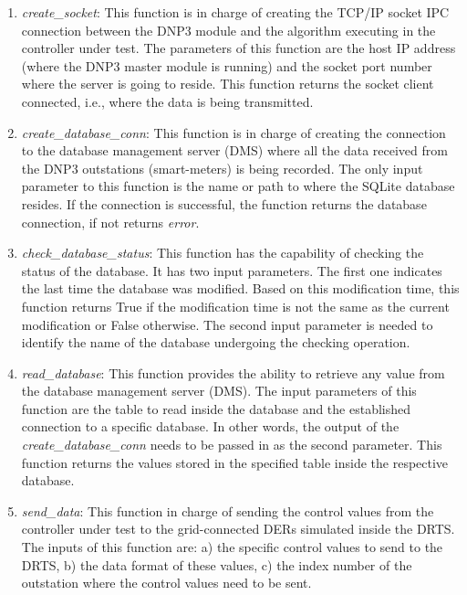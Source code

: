 \begin{enumerate}
    \item \textit{create\_socket}: This function is in charge of creating the TCP/IP socket IPC connection between the DNP3 module and the algorithm executing in the controller under test. The parameters of this function are the host IP address (where the DNP3 master module is running) and the socket port number where the server is going to reside. This function returns the socket client connected, i.e., where the data is being transmitted.
    
    \item \textit{create\_database\_conn}: This function is in charge of creating the connection to the database management server (DMS) where all the data received from the DNP3 outstations (smart-meters) is being recorded. The only input parameter to this function is the name or path to where the SQLite database resides. If the connection is successful, the function returns the database connection, if not returns \textit{error}.
    
    \item \textit{check\_database\_status}: This function has the capability of checking the status of the database. It has two input parameters. The first one indicates the last time the database was modified. Based on this modification time, this function returns True if the modification time is not the same as the current modification or False otherwise. The second input parameter is needed to identify the name of the database undergoing the checking operation.
    
    \item \textit{read\_database}: This function provides the ability to retrieve any value from the database management server (DMS). The input parameters of this function are the table to read inside the database and the established connection to a specific database. In other words, the output of the \textit{create\_database\_conn} needs to be passed in as the second parameter. This function returns the values stored in the specified table inside the respective database.
    
    \item \textit{send\_data}: This function in charge of sending the control values from the controller under test to the grid-connected DERs simulated inside the DRTS. The inputs of this function are: a) the specific control values to send to the DRTS, b) the data format of these values, c) the index number of the outstation where the control values need to be sent.
\end{enumerate}



